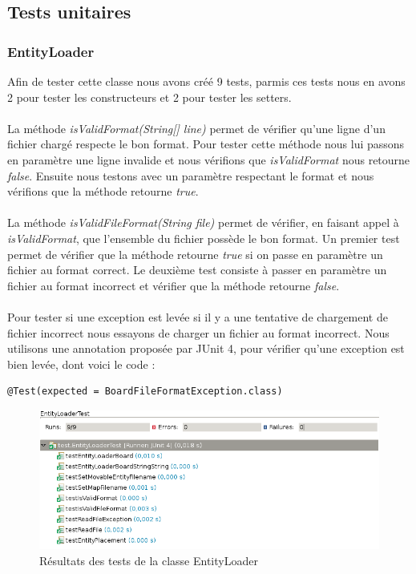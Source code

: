 		\subsection{Tests unitaires}

			\subsubsection{EntityLoader}
				
				Afin de tester cette classe nous avons créé 9 tests, parmis ces tests nous en avons 2 pour tester les constructeurs et 2 pour tester les setters.\\ \\
				La méthode {\itshape isValidFormat(String[] line)} permet de vérifier qu'une ligne d'un fichier chargé respecte le bon format.
				Pour tester cette méthode nous lui passons en paramètre une ligne invalide et nous vérifions que {\itshape isValidFormat} nous retourne {\itshape false}.
				Ensuite nous testons avec un paramètre respectant le format et nous vérifions que la méthode retourne {\itshape true}.\\ \\

				La méthode {\itshape isValidFileFormat(String file)} permet de vérifier, en faisant appel à {\itshape isValidFormat}, que l'ensemble du fichier possède le bon format.
				Un premier test permet de vérifier que la méthode retourne {\itshape true} si on passe en paramètre un fichier au format correct.
				Le deuxième test consiste à passer en paramètre un fichier au format incorrect et vérifier que la méthode retourne {\itshape false}.\\ \\

				Pour tester si une exception est levée si il y a une tentative de chargement de fichier incorrect nous essayons de charger un fichier au format incorrect.
				Nous utilisons une annotation proposée par JUnit 4, pour vérifier qu'une exception est bien levée, dont voici le code : 
				
				\begin{lstlisting}[frame=single]
@Test(expected = BoardFileFormatException.class)
				\end{lstlisting}

				\begin{figure}[!h]
				    \caption{Résultats des tests de la classe EntityLoader}
				    \centerline{\includegraphics[scale=0.7]{images/tests_unitaires/entityloader.png}}
				\end{figure}

